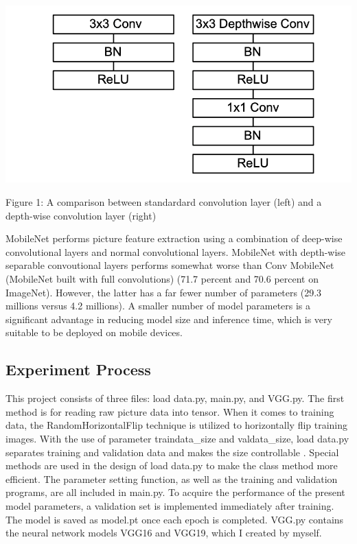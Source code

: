 \documentclass[11pt]{article}
\begin{document}
    \includegraphics{../pics/COMP.png}

Figure 1: A comparison between standardard convolution layer (left) and
a depth-wise convolution layer (right)

    MobileNet performs picture feature extraction using a combination of
deep-wise convolutional layers and normal convolutional layers.
MobileNet with depth-wise separable convoutional layers performs
somewhat worse than Conv MobileNet (MobileNet built with full
convolutions) (71.7 percent and 70.6 percent on ImageNet). However, the
latter has a far fewer number of parameters (29.3 millions versus 4.2
millions). A smaller number of model parameters is a significant
advantage in reducing model size and inference time, which is very
suitable to be deployed on mobile devices.

    \hypertarget{experiment-process}{%
\subsection{Experiment Process}\label{experiment-process}}

This project consists of three files: load data.py, main.py, and VGG.py.
The first method is for reading raw picture data into tensor. When it
comes to training data, the RandomHorizontalFlip technique is utilized
to horizontally flip training images. With the use of parameter
traindata\_size and valdata\_size, load data.py separates training and
validation data and makes the size controllable . Special methods are
used in the design of load data.py to make the class method more
efficient. The parameter setting function, as well as the training and
validation programs, are all included in main.py. To acquire the
performance of the present model parameters, a validation set is
implemented immediately after training. The model is saved as model.pt
once each epoch is completed. VGG.py contains the neural network models
VGG16 and VGG19, which I created by myself.
\end{document}
